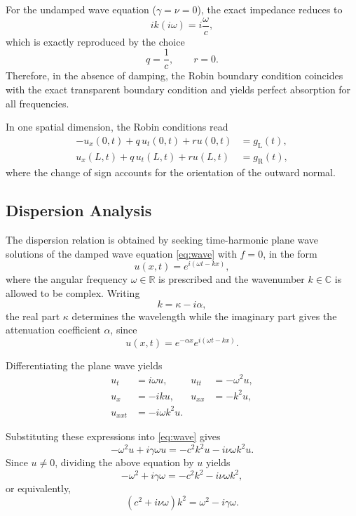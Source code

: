 \documentclass{Configuration_Files/PoliMi3i_thesis}
\begin{document}
For the undamped wave equation (\(\gamma=\nu=0\)), the exact impedance reduces to
\begin{equation*}
ik(i\omega)
=
i\frac{\omega}{c},
\end{equation*}
which is exactly reproduced by the choice
\begin{equation*}
q=\frac{1}{c},
\qquad
r=0.
\end{equation*}
Therefore, in the absence of damping, the Robin boundary condition coincides with the exact transparent boundary condition and yields perfect absorption for all frequencies.

In one spatial dimension, the Robin conditions read
\begin{align*}
-u_x(0,t)
+
q\,u_t(0,t)
+
ru(0,t)
&=
g_{\mathrm L}(t),
\\
u_x(L,t)
+
q\,u_t(L,t)
+
ru(L,t)
&=
g_{\mathrm R}(t),
\end{align*}
where the change of sign accounts for the orientation of the outward normal.

\subsection{Dispersion Analysis} \label{sec:dispersion_analysis}

The dispersion relation is obtained by seeking time-harmonic plane wave solutions of the damped wave equation \eqref{eq:wave} with \(f=0\), in the form
\begin{equation*}
u(x,t)
=
e^{i(\omega t-kx)},
\end{equation*}
where the angular frequency \(\omega\in\mathbb{R}\) is prescribed and the wavenumber
\(
k\in\mathbb{C}
\)
is allowed to be complex. Writing
\[
k=\kappa-i\alpha,
\]
the real part \(\kappa\) determines the wavelength while the imaginary part gives the attenuation coefficient \(\alpha\), since
\[
u(x,t)
=
e^{-\alpha x}
e^{i(\omega t-k x)}.
\]

Differentiating the plane wave yields
\begin{align*}
u_t
&=
i\omega u,
&
u_{tt}
&=
-\omega^2u,
\\
u_x
&=
-iku,
&
u_{xx}
&=
-k^2u,
\\
u_{xxt}
&=
-i\omega k^2u.
\end{align*}

Substituting these expressions into \eqref{eq:wave} gives
\begin{equation*}
-\omega^2u
+i\gamma\omega u
=
-c^2k^2u
-i\nu\omega k^2u.
\end{equation*}
Since \(u\neq0\), dividing the above equation by \(u\) yields
\begin{equation*}
-\omega^2+i\gamma\omega
=
-c^2k^2-i\nu\omega k^2,
\end{equation*}
or equivalently,
\begin{equation}
\label{eq:dispersion}
(c^2+i\nu\omega)k^2
=
\omega^2-i\gamma\omega.
\end{equation}
\end{document}
